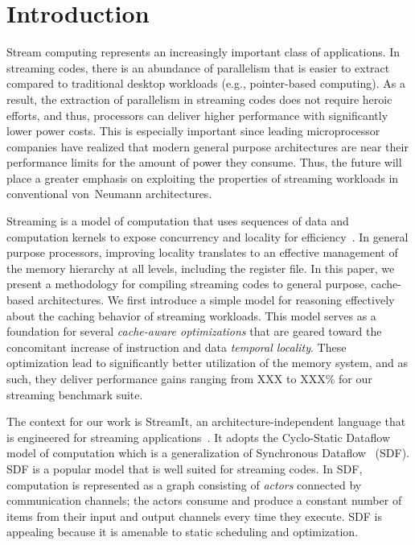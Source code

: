 \section{Introduction}


Stream computing represents an increasingly important class of
applications. In streaming codes, there is an abundance of parallelism that
is easier to extract compared to traditional desktop workloads (e.g.,
pointer-based computing). As a result, the extraction of parallelism
in streaming codes does not require heroic efforts, and thus,
processors can deliver higher performance with significantly lower
power costs. This is especially important since
leading microprocessor companies have realized that modern general
purpose architectures are near their  performance limits for  the
amount of power they consume. Thus, the future will place a greater
emphasis on exploiting the properties of streaming workloads in
conventional von~Neumann architectures.

Streaming is a model of computation that uses sequences of data
and computation kernels to expose concurrency and locality for
efficiency~\cite{wss}. In general purpose processors, improving locality 
translates to an effective management of the memory hierarchy at all
levels, including the register file. In this paper, we present a
methodology for compiling streaming codes to general purpose,
cache-based architectures. We first introduce a simple model for
reasoning effectively about the caching behavior of streaming
workloads. This model serves as a foundation for several {\it cache-aware
optimizations} that are geared toward the concomitant increase of instruction
and data {\it temporal locality}. These
optimization lead to significantly better utilization of the memory
system, and as such, they deliver performance gains ranging from XXX
to XXX\% for our streaming benchmark suite.

The context for our work is StreamIt, an architecture-independent
language that is engineered for streaming
applications~\cite{streamitcc}. It adopts the 
Cyclo-Static Dataflow~\cite{BELP96} model of computation which is a
generalization of Synchronous Dataflow~\cite{LM87-i} (SDF).  
SDF is a popular  model that  is well suited for
streaming codes. In SDF, computation is represented as a graph
consisting of {\it  actors} connected by communication channels; the
actors consume  and produce a constant number  of items from their
input and output  channels every time they execute. SDF is appealing
because it is amenable to static scheduling and optimization. 


